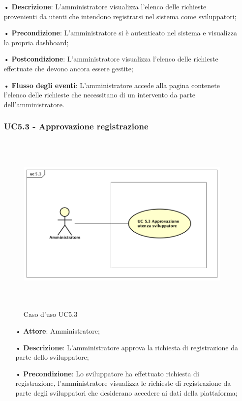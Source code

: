 \begin{itemize}
\begin{itemize}
\item[•] \textbf{Descrizione}: L'amministratore visualizza l'elenco delle richieste provenienti da utenti che intendono registrarsi nel sistema come sviluppatori;

\item[•] \textbf{Precondizione}: L'amministratore si è autenticato nel sistema e visualizza la propria dashboard;

\item[•] \textbf{Postcondizione}: L'amministratore visualizza l'elenco delle richieste effettuate che devono ancora essere gestite;

\item[•] \textbf{Flusso degli eventi}: L'amministratore accede alla pagina contenete l'elenco delle richieste che necessitano di un intervento da parte dell'amministratore.

\subsubsection{UC5.3 - Approvazione registrazione}
\begin{figure}[H]
\centering
\includegraphics[width=17cm, height=9cm]{img/UC53.png} 
\caption{Caso d'uso UC5.3}
\end{figure}

\begin{itemize}
\item[•] \textbf{Attore}: Amministratore;

\item[•] \textbf{Descrizione}: L'amministratore approva la richiesta di registrazione da parte dello sviluppatore;

\item[•] \textbf{Precondizione}: Lo sviluppatore ha effettuato richiesta di registrazione, l'amministratore visualizza le richieste di registrazione da parte degli sviluppatori che desiderano accedere ai dati della piattaforma;


\end{itemize}
\end{itemize}
\end{itemize}
